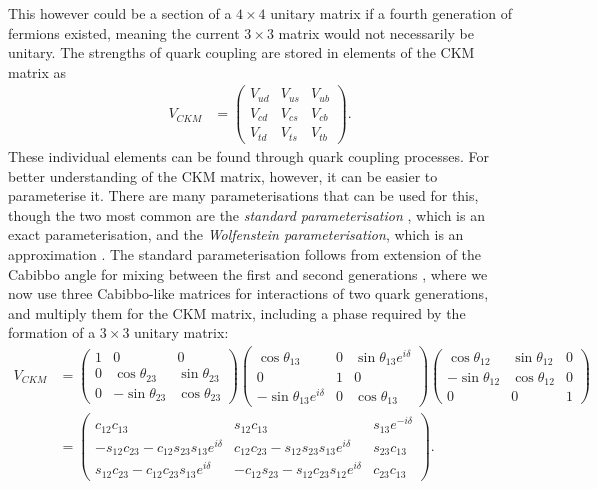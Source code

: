 \documentclass[a4paper,12pt]{article}
\begin{document}
This however could be a section of a $4\times4$ unitary matrix if a fourth generation of fermions existed, meaning the current $3\times3$ matrix would not necessarily be unitary. 
The strengths of quark coupling are stored in elements of the CKM matrix as
\begin{align}
    \label{eq:ckmub}
    V_{CKM} &= \begin{pmatrix}V_{ud}&V_{us}&V_{ub}\\V_{cd}&V_{cs}&V_{cb}\\V_{td}&V_{ts}&V_{tb}\end{pmatrix}.
\end{align}
These individual elements can be found through quark coupling processes. 
For better understanding of the CKM matrix, however, it can be easier to parameterise it. 
There are many parameterisations that can be used for this, though the two most common are the \emph{standard parameterisation} \cite{pdg}, which is an exact parameterisation, and the \emph{Wolfenstein parameterisation}, which is an approximation \cite{wolf}.
The standard parameterisation follows from extension of the Cabibbo angle for mixing between the first and second generations \cite{cabibbo}, where we now use three Cabibbo-like matrices for interactions of two quark generations, and multiply them for the CKM matrix, including a phase required by the formation of a $3\times3$ unitary matrix:
\begin{equation}
    \label{eq:standpar}
    \begin{split}
        V_{CKM} &= \begin{pmatrix}1&0&0\\0&\cos\theta_{23}&\sin\theta_{23}\\0&-\sin\theta_{23}&\cos\theta_{23}\end{pmatrix}\begin{pmatrix}\cos\theta_{13}&0&\sin\theta_{13}e^{i\delta}\\0&1&0\\-\sin\theta_{13}e^{i\delta}&0&\cos\theta_{13}\end{pmatrix}\begin{pmatrix}\cos\theta_{12}&\sin\theta_{12}&0\\-\sin\theta_{12}&\cos\theta_{12}&0\\0&0&1\end{pmatrix}\\
                &= \begin{pmatrix}c_{12}c_{13} & s_{12}c_{13} & s_{13}e^{-i\delta} \\ -s_{12}c_{23}-c_{12}s_{23}s_{13}e^{i\delta} & c_{12}c_{23}-s_{12}s_{23}s_{13}e^{i\delta} & s_{23}c_{13} \\ s_{12}c_{23}-c_{12}c_{23}s_{13}e^{i\delta} & -c_{12}s_{23}-s_{12}c_{23}s_{12}e^{i\delta} & c_{23}c_{13}\end{pmatrix}.
    \end{split}
\end{equation}
\end{document}
